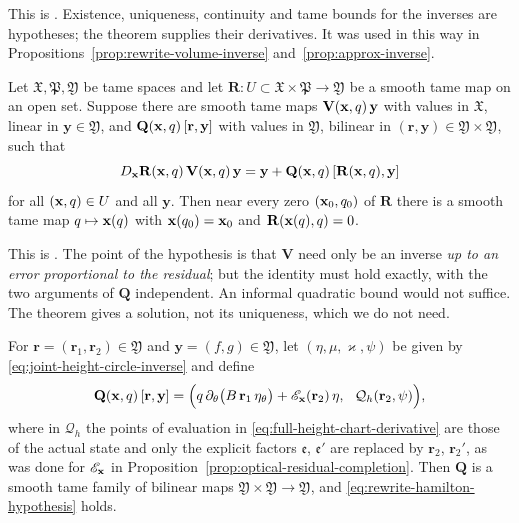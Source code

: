 This is \cite[Part~II, Theorem~3.1.1]{Hamilton1982}. Existence,
uniqueness, continuity and tame bounds for the inverses are
hypotheses; the theorem supplies their derivatives. It was used in
this way in Propositions~\ref{prop:rewrite-volume-inverse}
and~\ref{prop:approx-inverse}.

\begin{theorem}
\label{thm:hamilton-quadratic}
Let $\mathfrak X,\mathfrak P,\mathfrak Y$ be tame spaces and let
$\mathbf R:U\subset\mathfrak X\times\mathfrak P\to\mathfrak Y$ be a
smooth tame map on an open set. Suppose there are smooth tame maps
$\mathbf V(\mathbf x,q)\,\mathbf y$ with values in $\mathfrak X$, linear in
$\mathbf y\in\mathfrak Y$, and $\mathbf Q(\mathbf x,q)\,[\mathbf r,\mathbf y]$
with values in $\mathfrak Y$, bilinear in
$(\mathbf r,\mathbf y)\in\mathfrak Y\times\mathfrak Y$, such that
\begin{equation}\label{eq:rewrite-hamilton-hypothesis}
 D_{\mathbf x}\mathbf R(\mathbf x,q)\,\mathbf V(\mathbf x,q)\,\mathbf y
        =\mathbf y+\mathbf Q(\mathbf x,q)\,[\mathbf R(\mathbf x,q),\mathbf y]
\end{equation}
for all $(\mathbf x,q)\in U$ and all $\mathbf y$. Then near every zero
$(\mathbf x_0,q_0)$ of $\mathbf R$ there is a smooth tame map
$q\mapsto\mathbf x(q)$ with $\mathbf x(q_0)=\mathbf x_0$ and
$\mathbf R(\mathbf x(q),q)=0$.
\end{theorem}

This is \cite[Part~III, Theorem~3.3.1]{Hamilton1982}. The point of
the hypothesis is that $\mathbf V$ need only be an inverse \emph{up to
an error proportional to the residual}; but the identity must hold
exactly, with the two arguments of $\mathbf Q$ independent. An
informal quadratic bound would not suffice. The theorem gives a
solution, not its uniqueness, which we do not need.

\begin{proposition}\label{prop:quadratic-error}
For $\mathbf r=(\mathbf r_1,\mathbf r_2)\in\mathfrak Y$ and
$\mathbf y=(f,g)\in\mathfrak Y$, let $(\eta,\mu,\varkappa,\psi)$ be
given by \eqref{eq:joint-height-circle-inverse} and define
\[
 \mathbf Q(\mathbf x,q)\,[\mathbf r,\mathbf y]
 =\Bigl(q\,\partial_\theta\bigl(B\,\mathbf r_1\,\eta_\theta\bigr)
                   +\mathscr E_{\mathbf x}(\mathbf r_2)\,\eta,\ \
              \mathcal Q_h(\mathbf r_2,\psi)\Bigr),
\]
where in $\mathcal Q_h$ the points of evaluation in
\eqref{eq:full-height-chart-derivative} are those of the actual state
and only the explicit factors $\mathfrak e$, $\mathfrak e'$ are
replaced by $\mathbf r_2$, $\mathbf r_2'$, as was done for
$\mathscr E_{\mathbf x}$ in
Proposition~\ref{prop:optical-residual-completion}. Then $\mathbf Q$
is a smooth tame family of bilinear maps
$\mathfrak Y\times\mathfrak Y\to\mathfrak Y$, and
\eqref{eq:rewrite-hamilton-hypothesis} holds.
\end{proposition}

